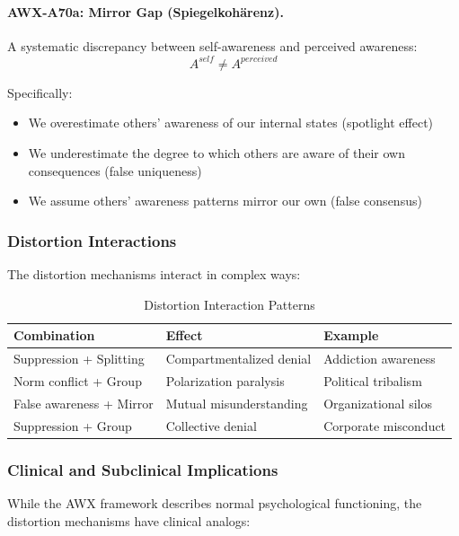 \paragraph{AWX-A70a: Mirror Gap (Spiegelkohärenz).}
A systematic discrepancy between self-awareness and perceived awareness:
\begin{equation}
A^{self} \neq A^{perceived}
\end{equation}

Specifically:
\begin{itemize}
    \item We overestimate others' awareness of our internal states 
          (spotlight effect)
    \item We underestimate the degree to which others are aware of 
          their own consequences (false uniqueness)
    \item We assume others' awareness patterns mirror our own 
          (false consensus)
\end{itemize}

\subsubsection{Distortion Interactions}

The distortion mechanisms interact in complex ways:

\begin{table}[htbp]
\centering
\caption{Distortion Interaction Patterns}
\label{tab:distortion-interactions}
\begin{tabular}{@{}lll@{}}
\toprule
\textbf{Combination} & \textbf{Effect} & \textbf{Example} \\
\midrule
Suppression + Splitting & Compartmentalized denial & Addiction awareness \\
Norm conflict + Group & Polarization paralysis & Political tribalism \\
False awareness + Mirror & Mutual misunderstanding & Organizational silos \\
Suppression + Group & Collective denial & Corporate misconduct \\
\bottomrule
\end{tabular}
\end{table}

\subsubsection{Clinical and Subclinical Implications}

While the AWX framework describes normal psychological functioning, 
the distortion mechanisms have clinical analogs:

